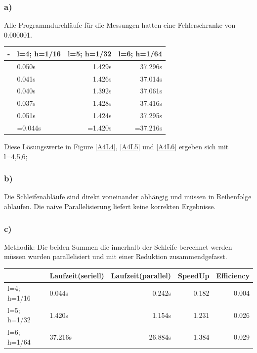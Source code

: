 \documentclass{article}
\begin{document}
	\subsubsection{a)}
Alle Programmdurchläufe für die Messungen hatten eine Fehlerschranke von 0.000001.\newline
\begin{tabular}{|l|l|r|r|}
		\hline
		- & l=4; h=1/16 & l=5; h=1/32 & l=6; h=1/64\\
		\hline
		& 0.050s & 1.429s & 37.296s \\
		& 0.041s & 1.426s & 37.014s  \\
		& 0.040s & 1.392s & 37.061s \\
		& 0.037s & 1.428s & 37.416s  \\
		& 0.051s & 1.424s & 37.295s  \\
		& =0.044s & =1.420s & =37.216s  \\
		\hline

	\end{tabular}
	\newline Diese Lösungswerte in Figure \ref{A4L4}, \ref{A4L5} und \ref{A4L6} ergeben sich mit l=4,5,6;  \newline
	
	\subsubsection{b)}
	Die Schleifenabläufe sind direkt voneinander abhängig und müssen in Reihenfolge ablaufen. Die naive Parallelisierung liefert keine korrekten Ergebnisse. 
	

	\subsubsection{c)}
		Methodik: Die beiden Summen die innerhalb der Schleife berechnet werden müssen wurden parallelisiert und mit einer Reduktion zusammendgefasst.\newline
		\begin{tabular}{|l|l|r|r|r|}
				\hline
				&Laufzeit(seriell) &Laufzeit(parallel) & SpeedUp & Efficiency\\
			\hline
			l=4; h=1/16 & 0.044s & 0.242s & 0.182 & 0.004 \\
			l=5; h=1/32 & 1.420s & 1.154s & 1.231 & 0.026 \\
				l=6; h=1/64 & 37.216s & 26.884s & 1.384 & 0.029 \\
				\hline

		\end{tabular}
\end{document}
